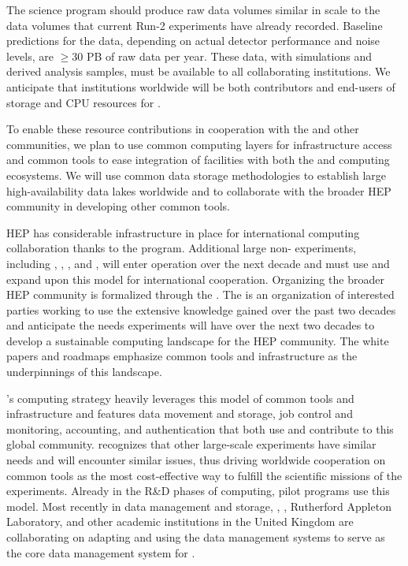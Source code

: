 The  science program should produce raw data volumes similar in scale to the data volumes that current  Run-2 experiments have already recorded.  Baseline predictions for the  data, depending on actual detector performance and noise levels, are $\ge 30$ PB of raw data per year.  These data, with simulations and derived analysis samples, must be available to all collaborating institutions.  We anticipate that institutions worldwide will be both contributors and end-users of storage and CPU resources for .

To enable these resource contributions in cooperation with the  and other communities, we plan to use common computing layers for infrastructure access and common tools to ease integration of facilities with both the  and  computing ecosystems.  We will use common data storage methodologies to establish large high-availability data lakes worldwide  and to collaborate with the broader HEP community in developing other common tools.


HEP has considerable infrastructure in place for international computing collaboration thanks to the  program.  Additional large non- experiments, including , , , and ,  will enter operation over the next decade and must use and expand upon this model for international cooperation.  Organizing the broader HEP community is formalized through the  \cite{Alves:2017she}.  The  is an organization of interested parties working to use the extensive knowledge gained over the past two decades and anticipate the needs experiments will have over the next two decades to develop a sustainable computing landscape for the HEP community.  The  white papers and roadmaps emphasize common tools and infrastructure as the underpinnings of this landscape.

's computing strategy heavily leverages this model of common tools and infrastructure and features data movement and storage, job control and monitoring, accounting, and authentication that both use and contribute to this global community.    recognizes that other large-scale experiments have similar needs and will encounter similar issues, thus driving worldwide cooperation on common tools as the most cost-effective way to fulfill the scientific missions of the experiments.  Already in the R\&D phases of  computing,  pilot programs use this model.  Most recently in data management and storage, , , Rutherford Appleton Laboratory, and other academic institutions in the United Kingdom are collaborating on adapting and using the  data management systems \cite{Barisits:2019fyl}  to serve as the core data management system for .

